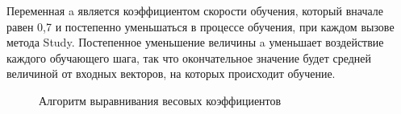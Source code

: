 \documentclass[14pt,a4paper]{extreport}
\begin{document}
  \hspace {4ex} Переменная a является коэффициентом скорости обучения, который вначале  равен 0,7 и постепенно уменьшаться в процессе обучения, при каждом вызове метода Study. Постепенное уменьшение величины a уменьшает воздействие каждого обучающего шага, так что окончательное значение будет средней величиной от входных векторов, на которых происходит обучение.\   
  \begin{figure}[h!]
\caption{Алгоритм выравнивания весовых коэффициентов}
\end{figure}  

\end{document}
